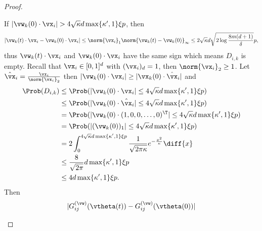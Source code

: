 \documentclass{article}
\begin{document}
\begin{proof}
\begin{enumerate}[(a)]
\begin{enumerate}[(i)]
\begin{equation}
                        \end{equation}
                        If $|\vw_k(0)\cdot\vx_i|>4\sqrt{\kappa}d\max\{\kappa',1\}\xi p$, then
                        \begin{equation}
                            |\vw_k(t)\cdot\vx_i-\vw_k(0)\cdot\vx_i|\leq\norm{\vx_i}_1\norm{\vw_k(t)-\vw_k(0)}_{\infty}\leq2\sqrt{\kappa}d\sqrt{2\log\frac{8m(d+1)}{\delta}} p,
                        \end{equation}
                        thus $\vw_k(t)\cdot\vx_i$ and $\vw_k(0)\cdot\vx_i$ have the same sign which means $D_{i,k}$ is empty. Recall that $\vx_i\in[0, 1]^d$ with $(\vx_i)_d=1$, then $\norm{\vx_i}_2\geq 1$. Let $\hat{\vx}_i=\frac{\vx_i}{\norm{\vx_i}_2}$ then $|\vw_k(0)\cdot\vx_i|\geq|\vx_k(0)\cdot\hat{\vx}_i|$ and
                        \begin{equation}
                            \begin{aligned}
                                \Prob(D_{i,k})
                                 & \leq\Prob(|\vw_k(0)\cdot\vx_i|\leq 4\sqrt{\kappa}d\max\{\kappa',1\}\xi p)                                   \\
                                 & \leq\Prob(|\vw_k(0)\cdot\hat{\vx}_i|\leq 4\sqrt{\kappa}d\max\{\kappa',1\}\xi p)                             \\
                                 & = \Prob(|\vw_k(0)\cdot(1,0,0,\ldots,0)^{\T}|\leq 4\sqrt{\kappa}d\max\{\kappa',1\}\xi p)                     \\
                                 & = \Prob(|(\vw_k(0))_1|\leq 4\sqrt{\kappa}d\max\{\kappa',1\}\xi p)                                           \\
                                 & = 2\int_0^{4\sqrt{\kappa}d\max\{\kappa',1\}\xi p}\frac{1}{\sqrt{2\pi\kappa}}e^{-\frac{x^2}{\kappa}}\diff{x} \\
                                 & \leq \frac{8}{\sqrt{2\pi}}d\max\{\kappa',1\}\xi p                                                           \\
                                 & \leq 4d\max\{\kappa',1\}\xi p.
                            \end{aligned}
                        \end{equation}
                        Then
                        \begin{equation}
                            \begin{aligned}
                                |G^{(\vw)}_{ij}(\vtheta(t))-G^{(\vw)}_{ij}(\vtheta(0))|

\end{aligned}
\end{equation}
\end{enumerate}
\end{enumerate}
\end{proof}
\end{document}

